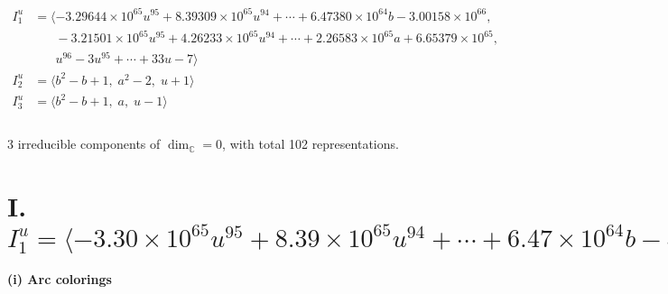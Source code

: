 \documentclass[1p]{elsarticle_modified}
\theoremstyle{definition}
\begin{document}
\begin{align*}
I^u_{1}&=\langle 
-3.29644\times10^{65} u^{95}+8.39309\times10^{65} u^{94}+\cdots+6.47380\times10^{64} b-3.00158\times10^{66},\\
\phantom{I^u_{1}}&\phantom{= \langle  }-3.21501\times10^{65} u^{95}+4.26233\times10^{65} u^{94}+\cdots+2.26583\times10^{65} a+6.65379\times10^{65},\\
\phantom{I^u_{1}}&\phantom{= \langle  }u^{96}-3 u^{95}+\cdots+33 u-7\rangle \\
I^u_{2}&=\langle 
b^2- b+1,\;a^2-2,\;u+1\rangle \\
I^u_{3}&=\langle 
b^2- b+1,\;a,\;u-1\rangle \\
\\
\end{align*}
\raggedright * 3 irreducible components of $\dim_{\mathbb{C}}=0$, with total 102 representations.\\
\newpage
\renewcommand{\arraystretch}{1}
\centering \section*{I. $I^u_{1}= \langle -3.30\times10^{65} u^{95}+8.39\times10^{65} u^{94}+\cdots+6.47\times10^{64} b-3.00\times10^{66},\;-3.22\times10^{65} u^{95}+4.26\times10^{65} u^{94}+\cdots+2.27\times10^{65} a+6.65\times10^{65},\;u^{96}-3 u^{95}+\cdots+33 u-7 \rangle$}
\flushleft \textbf{(i) Arc colorings}\\
\end{document}
